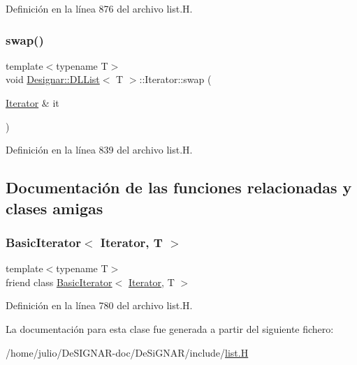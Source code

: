 Definición en la línea 876 del archivo list.\+H.

\mbox{\label{class_designar_1_1_d_l_list_1_1_iterator_afb6abdec64f67b81813441a4c7d133d1}} 
\subsubsection{\texorpdfstring{swap()}{swap()}}
{\footnotesize\ttfamily template$<$typename T$>$ \\
void \hyperlink{class_designar_1_1_d_l_list}{Designar\+::\+D\+L\+List}$<$ T $>$\+::Iterator\+::swap (\begin{DoxyParamCaption}\item[{\hyperlink{class_designar_1_1_d_l_list_1_1_iterator}{Iterator} \&}]{it }\end{DoxyParamCaption})\hspace{0.3cm}{\ttfamily [inline]}}



Definición en la línea 839 del archivo list.\+H.



\subsection{Documentación de las funciones relacionadas y clases amigas}
\mbox{\label{class_designar_1_1_d_l_list_1_1_iterator_ae3421d6be56b523bf3c41ceb29f3e5d7}} 
\subsubsection{\texorpdfstring{Basic\+Iterator$<$ Iterator, T $>$}{BasicIterator< Iterator, T >}}
{\footnotesize\ttfamily template$<$typename T$>$ \\
friend class \hyperlink{class_designar_1_1_basic_iterator}{Basic\+Iterator}$<$ \hyperlink{class_designar_1_1_d_l_list_1_1_iterator}{Iterator}, T $>$\hspace{0.3cm}{\ttfamily [friend]}}



Definición en la línea 780 del archivo list.\+H.



La documentación para esta clase fue generada a partir del siguiente fichero\+:\begin{DoxyCompactItemize}
\item 
/home/julio/\+De\+S\+I\+G\+N\+A\+R-\/doc/\+De\+Si\+G\+N\+A\+R/include/\hyperlink{list_8_h}{list.\+H}\end{DoxyCompactItemize}
